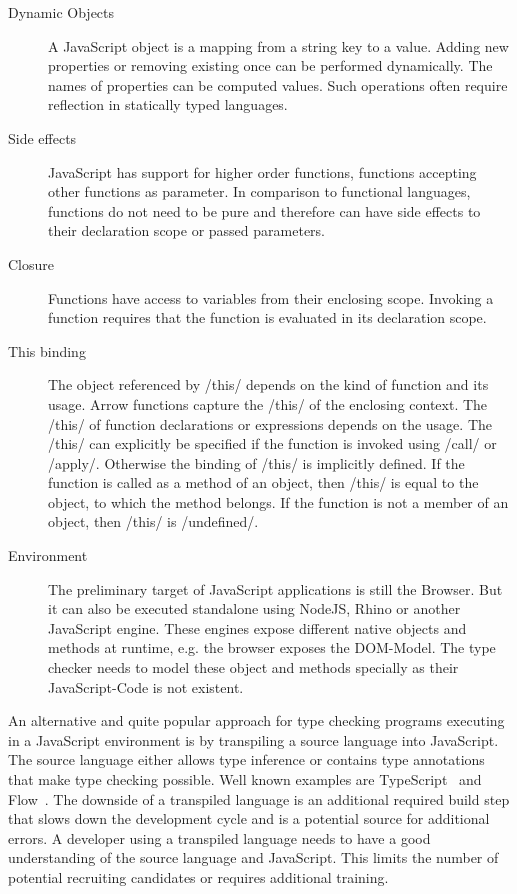 \begin{description}
	\item[Dynamic Objects] A JavaScript object is a mapping from a string key to a value. Adding new properties or removing existing once can be performed dynamically. The names of properties can be computed values. Such operations often require reflection in statically typed languages.

	\item[Side effects] JavaScript has support for higher order functions, functions accepting other functions as parameter. In comparison to functional languages, functions do not need to be pure and therefore can have side effects to their declaration scope or passed parameters. 
	
	\item[Closure] Functions have access to variables from their enclosing scope. Invoking a function requires that the function is evaluated in its declaration scope. 
	
	\item[This binding] The object referenced by \javascriptinline/this/ depends on the kind of function and its usage. Arrow functions capture the \javascriptinline/this/ of the enclosing context. The \javascriptinline/this/ of function declarations or expressions depends on the usage. The \javascriptinline/this/ can explicitly be specified if the function is invoked using \javascriptinline/call/ or \javascriptinline/apply/. Otherwise the binding of \javascriptinline/this/ is implicitly defined. If the function is called as a method of an object, then \javascriptinline/this/ is equal to the object, to which the method belongs. If the function is not a member of an object, then \javascriptinline/this/ is \javascriptinline/undefined/. 

	\item[Environment] The preliminary target of JavaScript applications is still the Browser. But it can also be executed standalone using NodeJS, Rhino or another JavaScript engine. These engines expose different native objects and methods at runtime, e.g. the browser exposes the DOM-Model. The type checker needs to model these object and methods specially as their JavaScript-Code is not existent.

\end{description}

An alternative and quite popular approach for type checking programs executing in a JavaScript environment is by transpiling a source language into JavaScript. The source language either allows type inference or contains type annotations that make type checking possible. Well known examples are TypeScript~\cite{Microsoft2012} and Flow~\cite{Facebook2014}. The downside of a transpiled language is an additional required build step that slows down the development cycle and is a potential source for additional errors. A developer using a transpiled language needs to have a good understanding of the source language and JavaScript. This limits the number of potential recruiting candidates or requires additional training.

